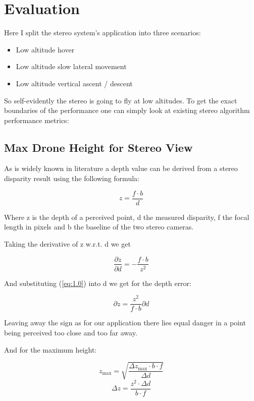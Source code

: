 \chapter*{Evaluation}

Here I split the stereo system's application into three scenarios:
\begin{itemize}
    \item Low altitude hover
    \item Low altitude slow lateral movement
    \item Low altitude vertical ascent / descent
\end{itemize}

So self-evidently the stereo is going to fly at low altitudes. To get the exact boundaries of the performance one can simply look at existing stereo algorithm performance metrics:

\section{Max Drone Height for Stereo View}
As is widely known in literature a depth value can be derived from a stereo disparity result using the following formula:

\begin{equation}\label{eq:1.0}
    z = \frac{f \cdot b}{d}
\end{equation}

Where z is the depth of a perceived point, d the measured disparity, f the focal length in pixels and b the baseline of the two stereo cameras.

Taking the derivative of z w.r.t. d we get

\begin{equation}
    \frac{\partial z}{\partial d} = - \frac{f  \cdot b}{z^2}
\end{equation}

And substituting (\ref{eq:1.0}) into d we get for the depth error:

\begin{equation}
    {\partial z} = \frac{z^2}{f  \cdot b}\partial d
\end{equation}

Leaving away the sign as for our application there lies equal danger in a point being perceived too close and too far away.

And for the maximum height:

\begin{equation}
    z_{\text{max}} = \sqrt{\frac{\Delta z_{\text{max}} \cdot b \cdot f}{\Delta d}}
\end{equation}
\begin{equation}
    \Delta z = \frac{z^2 \cdot \Delta d}{b \cdot f}
    \label{eq:depth_error}
\end{equation}

